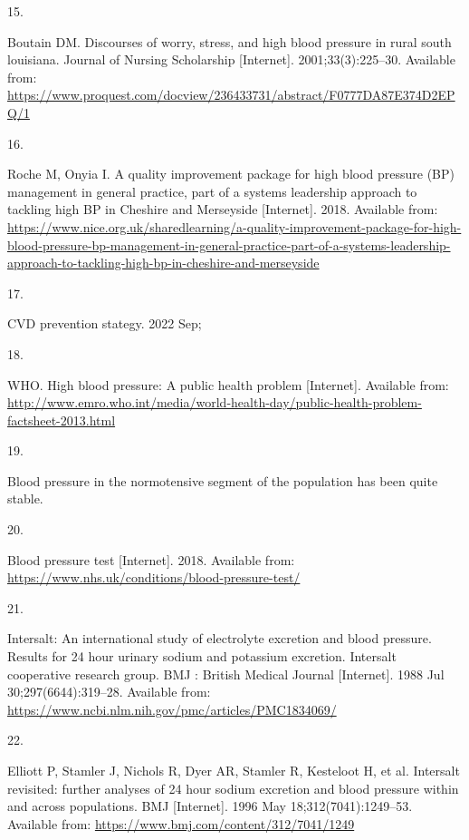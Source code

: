 \documentclass[
]{article}
\newlength{\cslhangindent}
\newlength{\csllabelwidth}
\newlength{\cslentryspacingunit} %
\newenvironment{CSLReferences}[2] %
 {%
  \setlength{\parindent}{0pt}
  \ifodd #1
  \let\oldpar\par
  \def\par{\hangindent=\cslhangindent\oldpar}
  \fi
  \setlength{\parskip}{#2\cslentryspacingunit}
 }%
 {}
\newcommand{\CSLLeftMargin}[1]{\parbox[t]{\csllabelwidth}{#1}}
\newcommand{\CSLRightInline}[1]{\parbox[t]{\linewidth - \csllabelwidth}{#1}\break}
\begin{document}
\begin{CSLReferences}{0}{0}
\leavevmode{}%
\CSLLeftMargin{15. }%
\CSLRightInline{Boutain DM. Discourses of worry, stress, and high blood
pressure in rural south louisiana. Journal of Nursing Scholarship
{[}Internet{]}. 2001;33(3):225--30. Available from:
\url{https://www.proquest.com/docview/236433731/abstract/F0777DA87E374D2EPQ/1}}

\leavevmode{}%
\CSLLeftMargin{16. }%
\CSLRightInline{Roche M, Onyia I. A quality improvement package for high
blood pressure (BP) management in general practice, part of a systems
leadership approach to tackling high BP in Cheshire and Merseyside
{[}Internet{]}. 2018. Available from:
\url{https://www.nice.org.uk/sharedlearning/a-quality-improvement-package-for-high-blood-pressure-bp-management-in-general-practice-part-of-a-systems-leadership-approach-to-tackling-high-bp-in-cheshire-and-merseyside}}

\leavevmode{}%
\CSLLeftMargin{17. }%
\CSLRightInline{CVD prevention stategy. 2022 Sep; }

\leavevmode{}%
\CSLLeftMargin{18. }%
\CSLRightInline{WHO. High blood pressure: A public health problem
{[}Internet{]}. Available from:
\url{http://www.emro.who.int/media/world-health-day/public-health-problem-factsheet-2013.html}}

\leavevmode{}%
\CSLLeftMargin{19. }%
\CSLRightInline{Blood pressure in the normotensive segment of the
population has been quite stable. }

\leavevmode{}%
\CSLLeftMargin{20. }%
\CSLRightInline{Blood pressure test {[}Internet{]}. 2018. Available
from: \url{https://www.nhs.uk/conditions/blood-pressure-test/}}

\leavevmode{}%
\CSLLeftMargin{21. }%
\CSLRightInline{Intersalt: An international study of electrolyte
excretion and blood pressure. Results for 24 hour urinary sodium and
potassium excretion. Intersalt cooperative research group. BMJ : British
Medical Journal {[}Internet{]}. 1988 Jul 30;297(6644):319--28. Available
from: \url{https://www.ncbi.nlm.nih.gov/pmc/articles/PMC1834069/}}

\leavevmode{}%
\CSLLeftMargin{22. }%
\CSLRightInline{Elliott P, Stamler J, Nichols R, Dyer AR, Stamler R,
Kesteloot H, et al. Intersalt revisited: further analyses of 24 hour
sodium excretion and blood pressure within and across populations. BMJ
{[}Internet{]}. 1996 May 18;312(7041):1249--53. Available from:
\url{https://www.bmj.com/content/312/7041/1249}}


\end{CSLReferences}
\end{document}
